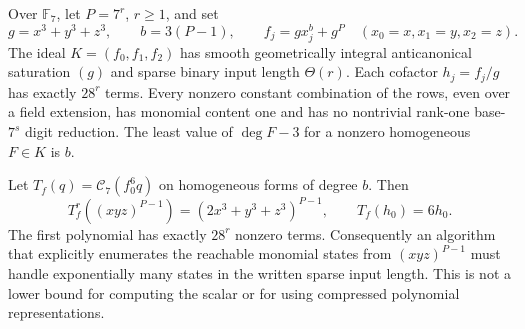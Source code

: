 \begin{proposition}
\label{sp:prop:cartier-states}
Over $\mathbb F_7$, let $P=7^r$, $r\ge1$, and set
\[
 g=x^3+y^3+z^3,\qquad b=3(P-1),\qquad
 f_j=gx_j^b+g^P\quad(x_0=x,x_1=y,x_2=z).
\]
The ideal $K=(f_0,f_1,f_2)$ has smooth geometrically integral
anticanonical saturation $(g)$ and sparse binary input length
$\Theta(r)$. Each cofactor $h_j=f_j/g$ has exactly $28^r$ terms.
Every nonzero constant combination of the rows, even over a field
extension, has monomial content one and has no nontrivial rank-one
base-$7^s$ digit reduction. The least value of $\deg F-3$ for a
nonzero homogeneous $F\in K$ is $b$.

Let $T_f(q)=\mathcal C_7(f_0^6q)$ on homogeneous forms of degree $b$.
Then
\[
 T_f^r((xyz)^{P-1})=(2x^3+y^3+z^3)^{P-1},\qquad
 T_f(h_0)=6h_0.
\]
The first polynomial has exactly $28^r$ nonzero terms. Consequently
an algorithm that explicitly enumerates the reachable monomial states
from $(xyz)^{P-1}$ must handle exponentially many states in the
written sparse input length. This is not a lower bound for computing
the scalar or for using compressed polynomial representations.
\end{proposition}
